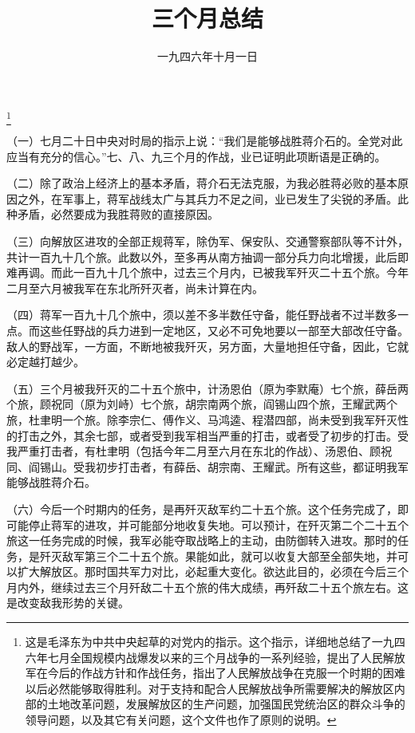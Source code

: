 
\title{三个月总结}
\date{一九四六年十月一日}
\thanks{这是毛泽东为中共中央起草的对党内的指示。这个指示，详细地总结了一九四六年七月全国规模内战爆发以来的三个月战争的一系列经验，提出了人民解放军在今后的作战方针和作战任务，指出了人民解放战争在克服一个时期的困难以后必然能够取得胜利。对于支持和配合人民解放战争所需要解决的解放区内部的土地改革问题，发展解放区的生产问题，加强国民党统治区的群众斗争的领导问题，以及其它有关问题，这个文件也作了原则的说明。}
\maketitle


（一）七月二十日中央对时局的指示上说：“我们是能够战胜蒋介石的。全党对此应当有充分的信心。”七、八、九三个月的作战，业已证明此项断语是正确的。

（二）除了政治上经济上的基本矛盾，蒋介石无法克服，为我必胜蒋必败的基本原因之外，在军事上，蒋军战线太广与其兵力不足之间，业已发生了尖锐的矛盾。此种矛盾，必然要成为我胜蒋败的直接原因。

（三）向解放区进攻的全部正规蒋军，除伪军、保安队、交通警察部队等不计外，共计一百九十几个旅。此数以外，至多再从南方抽调一部分兵力向北增援，此后即难再调。而此一百九十几个旅中，过去三个月内，已被我军歼灭二十五个旅。今年二月至六月被我军在东北所歼灭者，尚未计算在内。

（四）蒋军一百九十几个旅中，须以差不多半数任守备，能任野战者不过半数多一点。而这些任野战的兵力进到一定地区，又必不可免地要以一部至大部改任守备。敌人的野战军，一方面，不断地被我歼灭，另方面，大量地担任守备，因此，它就必定越打越少。

（五）三个月被我歼灭的二十五个旅中，计汤恩伯（原为李默庵）七个旅，薛岳两个旅，顾祝同（原为刘峙）七个旅，胡宗南两个旅，阎锡山四个旅，王耀武两个旅，杜聿明一个旅。除李宗仁、傅作义、马鸿逵、程潜四部，尚未受到我军歼灭性的打击之外，其余七部，或者受到我军相当严重的打击，或者受了初步的打击。受我严重打击者，有杜聿明（包括今年二月至六月在东北的作战）、汤恩伯、顾祝同、阎锡山。受我初步打击者，有薛岳、胡宗南、王耀武。所有这些，都证明我军能够战胜蒋介石。

（六）今后一个时期内的任务，是再歼灭敌军约二十五个旅。这个任务完成了，即可能停止蒋军的进攻，并可能部分地收复失地。可以预计，在歼灭第二个二十五个旅这一任务完成的时候，我军必能夺取战略上的主动，由防御转入进攻。那时的任务，是歼灭敌军第三个二十五个旅。果能如此，就可以收复大部至全部失地，并可以扩大解放区。那时国共军力对比，必起重大变化。欲达此目的，必须在今后三个月内外，继续过去三个月歼敌二十五个旅的伟大成绩，再歼敌二十五个旅左右。这是改变敌我形势的关键。

